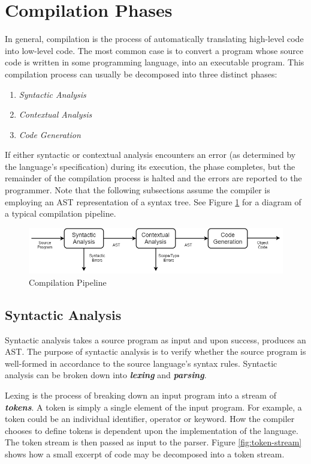 \documentclass{l4proj}
\begin{document}
\section{Compilation Phases}
In general, compilation is the process of automatically translating high-level code into low-level code. The most common case is to convert a program whose source code is written in some programming language, into an executable program. This compilation process can usually be decomposed into three distinct phases: 
\begin{enumerate}[label=\alph*)]
\item \textit {Syntactic Analysis}
\item \textit {Contextual Analysis}
\item \textit {Code Generation}
\end{enumerate}
If either syntactic or contextual analysis encounters an error (as determined by the language's specification) during its execution, the phase completes, but the remainder of the compilation process is halted and the errors are reported to the programmer. Note that the following subsections assume the compiler is employing an AST representation of a syntax tree. See Figure \ref{fig:compilation-pipeline} for a diagram of a typical compilation pipeline.

\begin{figure}[h]
\centering
\includegraphics[scale=0.5]{images/3-2a.png}
\caption{Compilation Pipeline}
\label{fig:compilation-pipeline}	
\end{figure}

\subsection{Syntactic Analysis}
Syntactic analysis takes a source program as input and upon success, produces an AST. The purpose of syntactic analysis is to verify whether the source program is well-formed in accordance to the source language's syntax rules. Syntactic analysis can be broken down into \textit{\textbf{lexing}} and \textit{\textbf{parsing}}.

Lexing is the process of breaking down an input program into a stream of \textit{\textbf{tokens}}. A token is simply a single element of the input program. For example, a token could be an individual identifier, operator or keyword. How the compiler chooses to define tokens is dependent upon the implementation of the language. The token stream is then passed as input to the parser. Figure \ref{fig:token-stream} shows how a small excerpt of code may be decomposed into a token stream.
\end{document}
